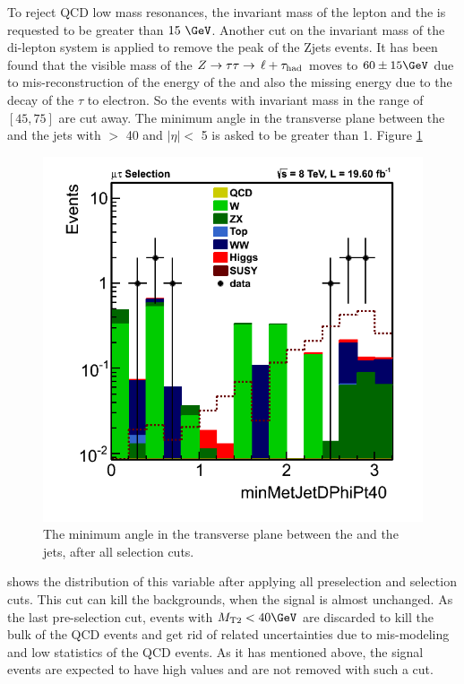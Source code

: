To reject QCD low mass resonances, the invariant mass of the lepton and the \Tau is requested to be greater than $15\ \GeV$. Another cut on the invariant mass of the di-lepton system is applied to remove the peak of the Zjets events. It has been found that the visible mass of the $Z\to\tau\tau\to\,\ell +\tau_{\rm had}$ moves to $60 \pm 15 \GeV$ due to mis-reconstruction of the energy of the \Tau and also the missing energy due to the decay of the $\tau$ to electron. So the events with invariant mass in the range of $[45,75]$ are cut away. The minimum angle in the transverse plane between the \MPT and the jets with \PT $>$ 40 \GeVc and $|\eta| <$ 5 is asked to be greater than 1. Figure \ref{fig:minDphi}
\begin{figure}[!Hhtb]
\centering
\includegraphics[angle=0,scale=0.35]{SelectionMuTau/minMetJetDPhi.png}
\caption{The minimum angle in the transverse plane between the \MPT and the jets, after all \muTau selection cuts.}
\label{fig:minDphi}
\end{figure}
shows the distribution of this variable after applying all preselection and selection cuts. This cut can kill the backgrounds, 
when the signal is almost unchanged.
As the last pre-selection cut, events with $\mttwo<40 \GeV$ are discarded to kill the bulk of the QCD events and get rid of related uncertainties due to mis-modeling and low statistics 
of the QCD events. As it has mentioned above, the signal events are expected to have high \mttwo values and are not removed with such a cut.

